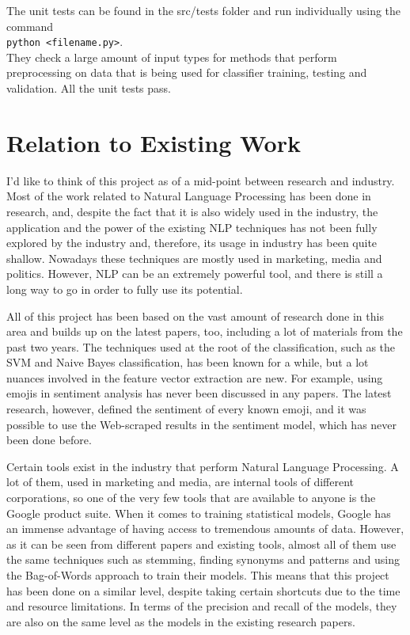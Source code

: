 The unit tests can be found in the src/tests folder and run individually using the command \\ \texttt{python <filename.py>}. \\ They check a large amount of input types for methods that perform preprocessing on data that is being used for classifier training, testing and validation. All the unit tests pass. 


\section{Relation to Existing Work}
\label{sec:relation}

I'd like to think of this project as of a mid-point between research and industry. Most of the work related to Natural Language Processing has been done in research, and, despite the fact that it is also widely used in the industry, the application and the power of the existing NLP techniques has not been fully explored by the industry and, therefore, its usage in industry has been quite shallow. Nowadays these techniques are mostly used in marketing, media and politics. However, NLP can be an extremely powerful tool, and there is still a long way to go in order to fully use its potential.

All of this project has been based on the vast amount of research done in this area and builds up on the latest papers, too, including a lot of materials from the past two years. The techniques used at the root of the classification, such as the SVM and Naive Bayes classification, has been known for a while, but a lot nuances involved in the feature vector extraction are new. For example, using emojis in sentiment analysis has never been discussed in any papers. The latest research, however, defined the sentiment of every known emoji, and it was possible to use the Web-scraped results in the sentiment model, which has never been done before. 

Certain tools exist in the industry that perform Natural Language Processing. A lot of them, used in marketing and media, are internal tools of different corporations, so one of the very few tools that are available to anyone is the Google product suite. When it comes to training statistical models, Google has an immense advantage of having access to tremendous amounts of data. However, as it can be seen from different papers and existing tools, almost all of them use the same techniques such as stemming, finding synonyms and patterns and using the Bag-of-Words approach to train their models. This means that this project has been done on a similar level, despite taking certain shortcuts due to the time and resource limitations. In terms of the precision and recall of the models, they are also on the same level as the models in the existing research papers. 